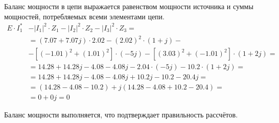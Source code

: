 \documentclass[12pt]{article}
\begin{document}
Баланс мощности в цепи выражается равенством мощности источника и суммы мощностей, потребляемых всеми элементами цепи. 
\begin{equation*}
  \begin{aligned}
    E \cdot I_1^* &- |I_1|^2 \cdot Z_1 - |I_2|^2 \cdot Z_2 - |I_3|^2 \cdot Z_3 = \\
    &= (7.07 + 7.07j) \cdot 2.02 - (2.02)^2 \cdot (1 + j) - \\
    &- \left[(-1.01)^2 + (1.01)^2\right] \cdot (-5j) - \left[(3.03)^2 + (-1.01)^2\right] \cdot (1 + 2j) = \\
    &= 14.28 + 14.28j - 4.08 - 4.08j - 2.04 \cdot (-5j) - 10.2 \cdot (1 + 2j) = \\
    &= 14.28 + 14.28j - 4.08 - 4.08j + 10.2j - 10.2 - 20.4j = \\
    &= (14.28 - 4.08 - 10.2) + j(14.28 - 4.08 + 10.2 - 20.4) = \\
    &= 0 + 0j = 0
  \end{aligned}
\end{equation*}

Баланс мощности выполняется, что подтверждает правильность рассчётов.
\end{document}
